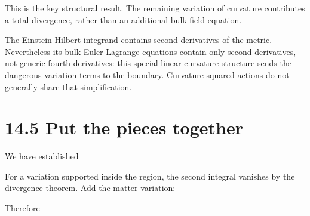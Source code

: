 \documentclass[
  11pt,
  letterpaper,
  oneside,
  openany]{scrbook}
\begin{document}
\begin{center}
\begingroup
{}
\ifdim\wd\grmathbox>\linewidth
\resizebox{\linewidth}{!}{\usebox{\grmathbox}}
\else\usebox{\grmathbox}\fi
\endgroup
\end{center}

This is the key structural result. The remaining variation of curvature
contributes a total divergence, rather than an additional bulk field
equation.

The Einstein-Hilbert integrand contains second derivatives of the
metric. Nevertheless its bulk Euler-Lagrange equations contain only
second derivatives, not generic fourth derivatives: this special
linear-curvature structure sends the dangerous variation terms to the
boundary. Curvature-squared actions do not generally share that
simplification.

\hypertarget{put-the-pieces-together}{%
\section{14.5 Put the pieces together}\label{put-the-pieces-together}}

We have established

\begin{center}
\begingroup
{}
\ifdim\wd\grmathbox>\linewidth
\resizebox{\linewidth}{!}{\usebox{\grmathbox}}
\else\usebox{\grmathbox}\fi
\endgroup
\end{center}

For a variation supported inside the region, the second integral
vanishes by the divergence theorem. Add the matter variation:

\begin{center}
\begingroup
{}
\ifdim\wd\grmathbox>\linewidth
\resizebox{\linewidth}{!}{\usebox{\grmathbox}}
\else\usebox{\grmathbox}\fi
\endgroup
\end{center}

Therefore

\begin{center}
\begingroup
{}
\ifdim\wd\grmathbox>\linewidth
\resizebox{\linewidth}{!}{\usebox{\grmathbox}}
\else\usebox{\grmathbox}\fi
\endgroup
\end{center}
\end{document}
